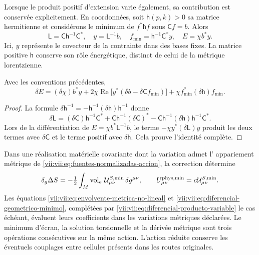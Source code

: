 Lorsque le produit positif d'extension varie également, sa
contribution est conservée explicitement. En coordonnées, soit
\(\mathsf h(p,k)>0\) sa matrice hermitienne et considérons le minimum
de \(f^*\mathsf h f\) sous \(\mathsf C f=b\). Alors
\begin{equation}
 \mathsf L=\mathsf C\mathsf h^{-1}\mathsf C^*,\quad
 y=\mathsf L^{-1}b,\quad
 f_{\min}=\mathsf h^{-1}\mathsf C^*y,\quad
 E=\chi b^*y.
 \label{vii:vii:eq:minimo-producto-variable}
\end{equation}
Ici, \(y\) représente le covecteur de la contrainte dans des bases fixes. La matrice positive \(\mathsf h\) conserve son rôle énergétique, distinct de celui de la métrique lorentzienne.

\begin{lemma}
\label{vii:vii:lem:producto-variable-extension}
Avec les conventions précédentes,
\begin{equation}
 \delta E=(\delta\chi)b^*y
   +2\chi\operatorname{Re}\bigl[y^*(\delta b-\delta\mathsf C f_{\min})\bigr]
   +\chi f_{\min}^*(\delta\mathsf h)f_{\min}.
 \label{vii:vii:eq:diferencial-producto-variable}
\end{equation}
\end{lemma}
\begin{proof}
La formule \(\delta\mathsf h^{-1}
=-\mathsf h^{-1}(\delta\mathsf h)\mathsf h^{-1}\) donne
\[
 \delta\mathsf L=(\delta\mathsf C)\mathsf h^{-1}\mathsf C^*
 +\mathsf C\mathsf h^{-1}(\delta\mathsf C)^*
 -\mathsf C\mathsf h^{-1}(\delta\mathsf h)
                              \mathsf h^{-1}\mathsf C^*.
\]
Lors de la différentiation de \(E=\chi b^*\mathsf L^{-1}b\), le terme \(-\chi y^*(\delta\mathsf L)y\) produit les deux termes avec \(\delta\mathsf C\) et le terme positif avec \(\delta\mathsf h\). Cela prouve l'identité complète.
\end{proof}

Dans une réalisation matérielle covariante dont la variation admet l'
appariement métrique de
\eqref{vii:vii:eq:fuentes-normalizadas-accion}, la correction détermine
\begin{equation}
 \delta_g\Delta S
 =-\tfrac12\int_M\operatorname{vol}_e\,
          \mathcal U^{S,\min}_{\mu\nu}\,\delta g^{\mu\nu},
 \qquad U^{\rm phys,\min}_{\mu\nu}
                      =c\mathcal U^{S,\min}_{\mu\nu}.
 \label{vii:vii:eq:fuente-metrica-minimo-no-lineal}
\end{equation}
Les équations \eqref{vii:vii:eq:envolvente-metrica-no-lineal} et
\eqref{vii:vii:eq:diferencial-geometrico-minimo}, complétées par
\eqref{vii:vii:eq:diferencial-producto-variable} le cas échéant,
évaluent leurs coefficients dans les variations métriques déclarées.
Le minimum d'écran, la solution torsionnelle et la dérivée métrique
sont trois opérations consécutives sur la même action.
L'action réduite conserve les éventuels couplages entre
cellules présents dans les routes originales.

